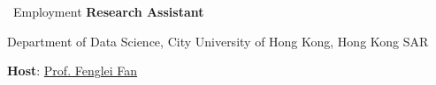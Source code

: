 \begin{rubric}{\faUser\ Employment}
\entry*[2026.07 -- Present]%
    \textbf{Research Assistant}\par
    Department of Data Science, City University of Hong Kong, Hong Kong SAR\par
    \textbf{Host}: \href{https://fengleifan.github.io/Feng-Lei.Fan.github.io/}{Prof. Fenglei Fan}
\end{rubric}
